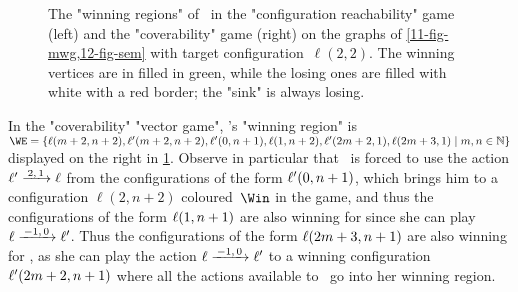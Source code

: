\begin{example}
\begin{figure}[htbp]
{}
  \caption{\label{11-fig-cov} The "winning regions" of \Eve\ in the
    "configuration reachability" game (left) and the "coverability" game
    (right) on the graphs of \cref{11-fig-mwg,12-fig-sem} with target
    configuration~$\ell(2,2)$.  The winning vertices are in filled in
    green, while the losing ones are filled with white with a red
    border; the "sink" is always losing.}
\end{figure}

In the "coverability" "vector game", \Eve's "winning region" is
$\WE=\{\loc(m+2,n+2),\loc'(m+2,n+2),\loc'(0,n+1),\loc(1,n+2),\loc'(2m+2,1),\loc(2m+3,1)\mid
m,n\in\+N\}$
displayed on the right in \cref{11-fig-cov}.  Observe in particular
that \Adam\ is forced to use the action $\ell'\step{2,1}\ell$ from
the configurations of the form $\ell'(0,n+1)$, which brings him to a
configuration $\ell(2,n+2)$ coloured~$\Win$ in the game, and thus the
configurations of the form $\ell(1,n+1)$ are also winning for \Eve
since she can play $\loc\step{-1,0}\loc'$.  Thus the configurations of
the form $\ell(2m+3,n+1)$ are also winning for \Eve, as she can play
the action $\loc\step{-1,0}\loc'$ to a winning configuration
$\ell'(2m+2,n+1)$ where all the actions available to \Adam\ go into
her winning region.
\end{example}

